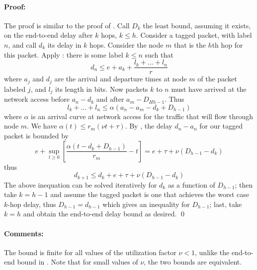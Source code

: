 \paragraph{Proof: }
The proof is similar to the proof of . Call
$D_k$ the least bound, assuming it exists, on the end-to-end delay
after $k$ hops, $k \leq h$. Consider a tagged packet, with label
$n$, and call $d_k$ its delay in $k$ hops. Consider the node $m$
that is the $h$th hop for this packet. Apply :
there is some label $k\leq n$ such that
\begin{equation}\label{eq-setf-1}
d_n \leq e + a_k + \frac{l_k + ... + l_n}{r}
\end{equation}
where $a_j$ and $d_j$ are the arrival and departure times at node
$m$ of the packet labeled $j$, and $l_j$ its length in bits. Now
packets $k$ to $n$ must have arrived at the network access before
$a_n - d_k$ and after $a_m -D_{Hh-1}$. Thus
$$
l_k + ... + l_n \leq \alpha(a_n - a_m - d_k + D_{h-1})
$$
where $\alpha$ is an arrival curve at network access for the
traffic that will flow through node $m$. We have $\alpha(t)\leq
r_m (\nu t +\tau)$. By , the delay $d_n-a_n$ for
our tagged packet is bounded by
$$
e + \sup_{t \geq 0}\left[ \frac{\alpha(t- d_k + D_{h-1})}{r_m}
-t\right] = e + \tau+ \nu (D_{h-1}- d_k)
$$
thus
$$
d_{k+1}\leq d_k +e + \tau+ \nu (D_{h-1}- d_k)
$$
The above inequation can be solved iteratively for $d_k$ as a
function of $D_{h-1}$; then take $k=h-1$ and assume the tagged
packet is one that achieves the worst case $k$-hop delay, thus
$D_{h-1}=d_{h-1}$ which gives an inequality for $D_{h-1}$; last,
take $k=h$ and obtain
the end-to-end delay bound as desired. \qed

\paragraph{Comments: }
 The bound is finite for all
values of the utilization factor $\nu<1$, unlike the end-to-end
bound in . Note that for small values of
$\nu$, the two bounds are equivalent.

